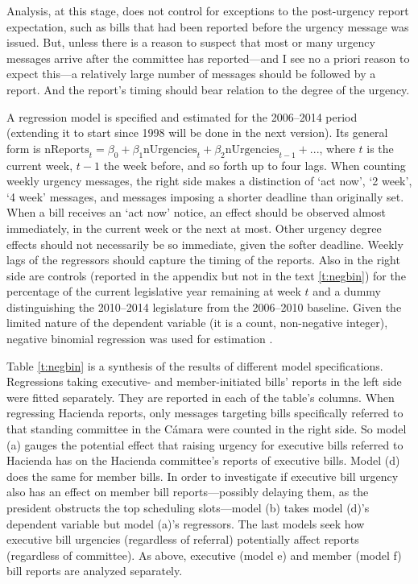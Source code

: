 \documentclass[letter,12pt]{article}
\begin{document}
Analysis, at this stage, does not control for exceptions to the post-urgency report expectation, such as bills that had been reported before the urgency message was issued. But, unless there is a reason to suspect that most or many urgency messages arrive after the committee has reported---and I see no a priori reason to expect this---a relatively large number of messages should be followed by a report. And the report's timing should bear relation to the degree of the urgency. 

A regression model is specified and estimated for the 2006--2014 period (extending it to start since 1998 will be done in the next version). Its general form is $\text{nReports}_t = \beta_0 + \beta_1 \text{nUrgencies}_t + \beta_2 \text{nUrgencies}_{t-1} + ...$, where $t$ is the current week, $t-1$ the week before, and so forth up to four lags. When counting weekly urgency messages, the right side makes a distinction of `act now', `2 week', `4 week' messages, and messages imposing a shorter deadline than originally set. When a bill receives an `act now' notice, an effect should be observed almost immediately, in the current week or the next at most. Other urgency degree effects should not necessarily be so immediate, given the softer deadline. Weekly lags of the regressors should capture the timing of the reports. Also in the right side are controls (reported in the appendix but not in the text \ref{t:negbin}) for the percentage of the current legislative year remaining at week $t$ and a dummy distinguishing the 2010--2014 legislature from the 2006--2010 baseline. Given the limited nature of the dependent variable (it is a count, non-negative integer), negative binomial regression was used for estimation \citep{cameron.trivedi.1998}. 

Table \ref{t:negbin} is a synthesis of the results of different model specifications. Regressions taking executive- and member-initiated bills' reports in the left side were fitted separately. They are reported in each of the table's columns. When regressing Hacienda reports, only messages targeting bills specifically referred to that standing committee in the C\'amara were counted in the right side. So model (a) gauges the potential effect that raising urgency for executive bills referred to Hacienda has on the Hacienda committee's reports of executive bills. Model (d) does the same for member bills. In order to investigate if executive bill urgency also has an effect on member bill reports---possibly delaying them, as the president obstructs the top scheduling slots---model (b) takes model (d)'s dependent variable but model (a)'s regressors. The last models seek how executive bill urgencies (regardless of referral) potentially affect reports (regardless of committee). As above, executive (model e) and member (model f) bill reports are analyzed separately.
\end{document}
